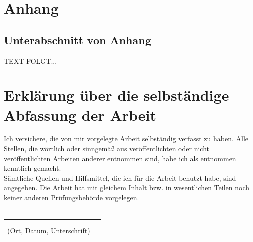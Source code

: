 \documentclass[a4paper,12pt,oneside]{article}
\begin{document}
  \newpage
  \setcounter{section}{0} %
  \renewcommand*\thesection{\Alph{section}} %
  \section{Anhang}\label{anhang}
    \subsection{Unterabschnitt von Anhang}\label{subsec_UabsAnhang}
    TEXT FOLGT...
  
  \newpage
  
 \pagestyle{empty}
 \section*{Erklärung über die selbständige\\Abfassung der Arbeit} %
 Ich versichere, die von mir vorgelegte Arbeit selbständig verfasst zu haben.
 Alle Stellen, die wörtlich oder sinngemäß aus veröffentlichten oder nicht veröffentlichten Arbeiten anderer entnommen sind,
 habe ich als entnommen kenntlich gemacht.\\ 
 Sämtliche Quellen und Hilfsmittel, die ich für die Arbeit benutzt habe, sind
 angegeben. Die Arbeit hat mit gleichem Inhalt bzw. in wesentlichen Teilen noch keiner anderen Prüfungsbehörde vorgelegen.\\\\
\begin{tabular}{cp{7cm}}
    & \\ 
    & \\ \hline
  \small (Ort, Datum, Unterschrift) & \normalsize \\
  \end{tabular}
  
\end{document}
